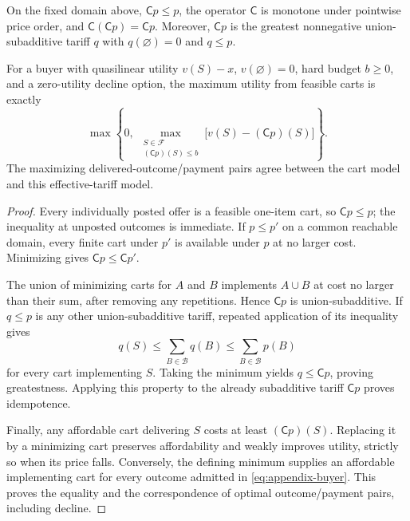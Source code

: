 \begin{proposition}
\label{prop:closure}
On the fixed domain above, $\mathsf Cp\le p$, the operator $\mathsf C$ is monotone under pointwise price order, and $\mathsf C(\mathsf Cp)=\mathsf Cp$. Moreover, $\mathsf Cp$ is the greatest nonnegative union-subadditive tariff $q$ with $q(\varnothing)=0$ and $q\le p$.

For a buyer with quasilinear utility $v(S)-x$, $v(\varnothing)=0$, hard budget $b\ge0$, and a zero-utility decline option, the maximum utility from feasible carts is exactly
\begin{equation}
\max\left\{0,\ \max_{\substack{S\in\mathcal F\\(\mathsf Cp)(S)\le b}}
\bigl[v(S)-(\mathsf Cp)(S)\bigr]\right\}.
\label{eq:appendix-buyer}
\end{equation}
The maximizing delivered-outcome/payment pairs agree between the cart model and this effective-tariff model.
\end{proposition}

\begin{proof}
Every individually posted offer is a feasible one-item cart, so $\mathsf Cp\le p$; the inequality at unposted outcomes is immediate. If $p\le p'$ on a common reachable domain, every finite cart under $p'$ is available under $p$ at no larger cost. Minimizing gives $\mathsf Cp\le\mathsf Cp'$.

The union of minimizing carts for $A$ and $B$ implements $A\cup B$ at cost no larger than their sum, after removing any repetitions. Hence $\mathsf Cp$ is union-subadditive. If $q\le p$ is any other union-subadditive tariff, repeated application of its inequality gives
\[
q(S)\le\sum_{B\in\mathcal B}q(B)
       \le\sum_{B\in\mathcal B}p(B)
\]
for every cart implementing $S$. Taking the minimum yields $q\le\mathsf Cp$, proving greatestness. Applying this property to the already subadditive tariff $\mathsf Cp$ proves idempotence.

Finally, any affordable cart delivering $S$ costs at least $(\mathsf Cp)(S)$. Replacing it by a minimizing cart preserves affordability and weakly improves utility, strictly so when its price falls. Conversely, the defining minimum supplies an affordable implementing cart for every outcome admitted in \eqref{eq:appendix-buyer}. This proves the equality and the correspondence of optimal outcome/payment pairs, including decline.
\end{proof}

